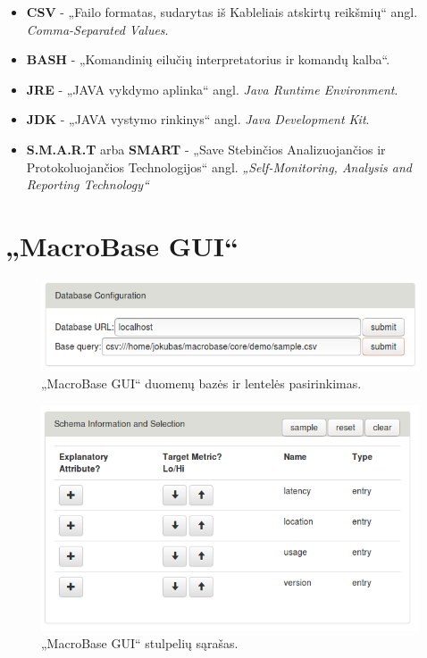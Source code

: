\documentclass{VUMIFPSkursinis}
\begin{document}
\printbibliography[heading=bibintoc]

\begin{itemize}
\item \textbf{CSV} - „Failo formatas, sudarytas iš Kableliais atskirtų reikšmių“ angl. \textit{Comma-Separated Values}.

\item \textbf{BASH} - „Komandinių eilučių interpretatorius ir komandų kalba“.

\item \textbf{JRE} - „JAVA vykdymo aplinka“ angl. \textit{Java Runtime Environment}.

\item \textbf{JDK} - „JAVA vystymo rinkinys“ angl. \textit{Java Development Kit}.

\item \textbf{S.M.A.R.T} arba \textbf{SMART} - „Save Stebinčios Analizuojančios ir Protokoluojančios Technologijos“ angl. \textit{„Self-Monitoring, Analysis and Reporting Technology“}

\end{itemize}

\appendix

\section{„MacroBase GUI“} \label{sec:macrogui}
\begin{figure}[H]
    \centering
    \includegraphics[scale=0.5]{img/query}
    \caption{„MacroBase GUI“ duomenų bazės ir lentelės pasirinkimas.}
    \label{img:query}
\end{figure}

\begin{figure}[H]
    \centering
    \includegraphics[scale=0.5]{img/all}
    \caption{„MacroBase GUI“ stulpelių sąrašas.}
    \label{img:all}
\end{figure}
\end{document}
